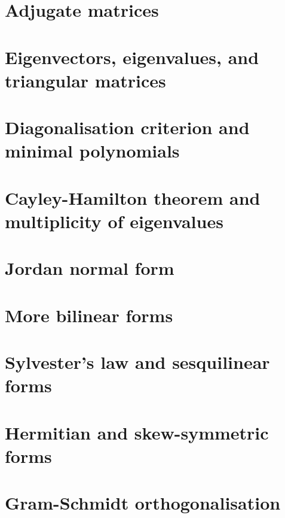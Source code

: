 \documentclass{article}
\begin{document}
\section{Adjugate matrices}

\section{Eigenvectors, eigenvalues, and triangular matrices}

\section{Diagonalisation criterion and minimal polynomials}

\section{Cayley-Hamilton theorem and multiplicity of eigenvalues}

\section{Jordan normal form}

\section{More bilinear forms}

\section{Sylvester's law and sesquilinear forms}

\section{Hermitian and skew-symmetric forms}

\section{Gram-Schmidt orthogonalisation}

\end{document}
